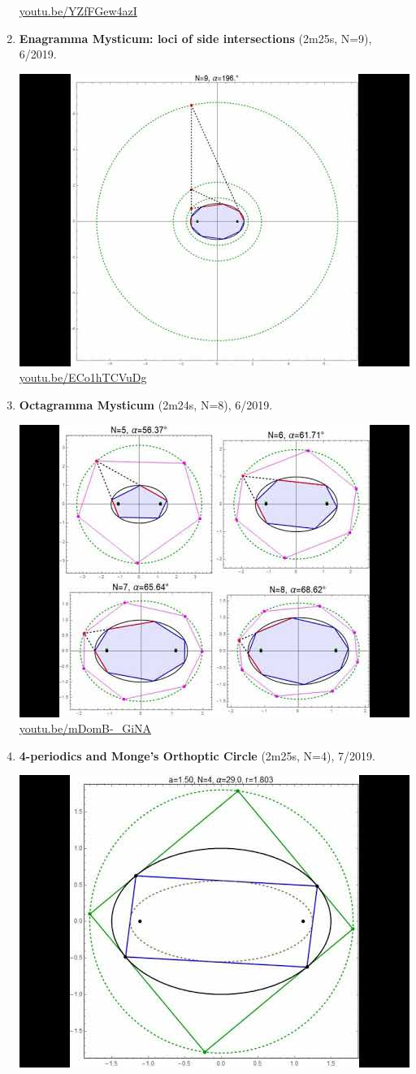 \documentclass[12pt]{amsart}
\begin{document}
\begin{enumerate}[resume]
\begin{center}
\href{https://youtu.be/YZfFGew4azI}{\url{youtu.be/YZfFGew4azI}}\end{center}
% 
\item \textbf{Enagramma Mysticum: loci of side intersections} (2m25s, N=9), 6/2019. 
\begin{center}\includegraphics[width=.5\textwidth]{pics/ECo1hTCVuDg.jpg} \\ 
\href{https://youtu.be/ECo1hTCVuDg}{\url{youtu.be/ECo1hTCVuDg}}\end{center}
% 
\item \textbf{Octagramma Mysticum} (2m24s, N=8), 6/2019. 
\begin{center}\includegraphics[width=.5\textwidth]{pics/mDomB-_GiNA.jpg} \\ 
\href{https://youtu.be/mDomB-_GiNA}{\url{youtu.be/mDomB-\_GiNA}}\end{center}
% 
\item \textbf{4-periodics and Monge's Orthoptic Circle} (2m25s, N=4), 7/2019. 
\begin{center}\includegraphics[width=.5\textwidth]{pics/9fI3iM2jrmI.jpg} \\ 

\end{center}
\end{enumerate}
\end{document}
